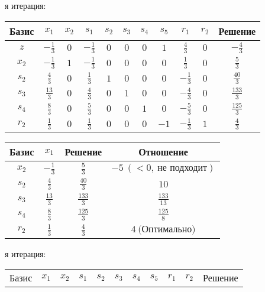 \documentclass{article}%
\begin{document}
\begin{flushleft}
\newline%
я итерация: %
\newline%
\newline%
\renewcommand{\arraystretch}{1.3}%
\begin{tabular}{|c|ccccccccc|c|}%
\hline%
Базис&$x_{1}$&$x_{2}$&$s_{1}$&$s_{2}$&$s_{3}$&$s_{4}$&$s_{5}$&$r_{1}$&$r_{2}$&Решение\\%
\hline%
$z$&$-\frac{1}{3}$&$0$&$-\frac{1}{3}$&$0$&$0$&$0$&$1$&$\frac{4}{3}$&$0$&$-\frac{4}{3}$\\%
\hline%
$x_{2}$&$-\frac{1}{3}$&$1$&$-\frac{1}{3}$&$0$&$0$&$0$&$0$&$\frac{1}{3}$&$0$&$\frac{5}{3}$\\%
$s_{2}$&$\frac{4}{3}$&$0$&$\frac{1}{3}$&$1$&$0$&$0$&$0$&$-\frac{1}{3}$&$0$&$\frac{40}{3}$\\%
$s_{3}$&$\frac{13}{3}$&$0$&$\frac{4}{3}$&$0$&$1$&$0$&$0$&$-\frac{4}{3}$&$0$&$\frac{133}{3}$\\%
$s_{4}$&$\frac{8}{3}$&$0$&$\frac{5}{3}$&$0$&$0$&$1$&$0$&$-\frac{5}{3}$&$0$&$\frac{125}{3}$\\%
$r_{2}$&$\frac{1}{3}$&$0$&$\frac{1}{3}$&$0$&$0$&$0$&$-1$&$-\frac{1}{3}$&$1$&$\frac{4}{3}$\\%
\hline%
\end{tabular}%
\newline%
\newline%
\newline%
\begin{tabular}{|cccc|}%
\hline%
Базис&$x_{1}$&Решение&Отношение\\%
\hline%
$x_{2}$&$-\frac{1}{3}$&$\frac{5}{3}$&$-5\: (< 0, \: \text{не подходит})$\\%
$s_{2}$&$\frac{4}{3}$&$\frac{40}{3}$&$10$\\%
$s_{3}$&$\frac{13}{3}$&$\frac{133}{3}$&$\frac{133}{13}$\\%
$s_{4}$&$\frac{8}{3}$&$\frac{125}{3}$&$\frac{125}{8}$\\%
$r_{2}$&$\frac{1}{3}$&$\frac{4}{3}$&$4\: \text{(Оптимально)}$\\%
\hline%
\end{tabular}%
\newline%
\newline%
я итерация: %
\newline%
\newline%
\renewcommand{\arraystretch}{1.3}%
\begin{tabular}{|c|ccccccccc|c|}%
\hline%
Базис&$x_{1}$&$x_{2}$&$s_{1}$&$s_{2}$&$s_{3}$&$s_{4}$&$s_{5}$&$r_{1}$&$r_{2}$&Решение\\%

\end{tabular}
\end{flushleft}
\end{document}
